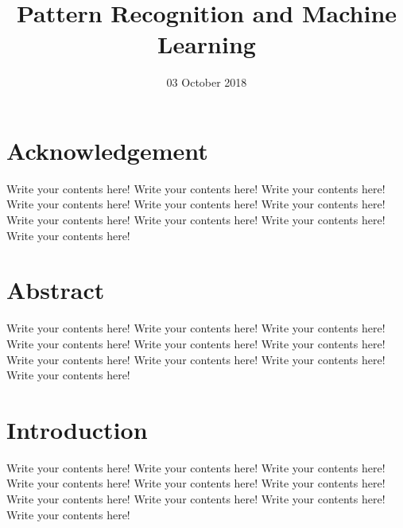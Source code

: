 \documentclass[12pt,a4paper]{ruppmath}
\title{Pattern Recognition and Machine Learning}
\date{03 October 2018}
\begin{document}
\maketitle
{}
\tableofcontents
{}
\chapter*{Acknowledgement}
Write your contents here! Write your contents here! Write your contents here! Write your contents here! Write your contents here! Write your contents here! Write your contents here! Write your contents here! Write your contents here! Write your contents here! 
\chapter*{Abstract}
Write your contents here! Write your contents here! Write your contents here! Write your contents here! Write your contents here! Write your contents here! Write your contents here! Write your contents here! Write your contents here! Write your contents here! 
\chapter{Introduction}
Write your contents here! Write your contents here! Write your contents here! Write your contents here! Write your contents here! Write your contents here! Write your contents here! Write your contents here! Write your contents here! Write your contents here! 
\end{document}
